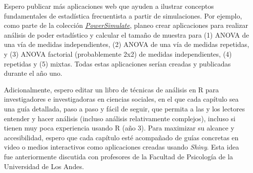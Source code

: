 \documentclass[11pt,a4paper,]{awesome-cv}
\begin{document}
\begin{footnotesize}

Espero publicar más aplicaciones web que ayuden a ilustrar conceptos fundamentales de estadística frecuentista a partir de simulaciones. Por ejemplo, como parte de la colección \href{https://shiny.jdl-svr.lat/PowerSimulate/}{\textit{PowerSimulate}}, planeo crear aplicaciones para realizar análisis de poder estadístico y calcular el tamaño de muestra para (1) ANOVA de una vía de medidas independientes, (2) ANOVA de una vía de medidas repetidas, y (3) ANOVA factorial (probablemente 2x2) de medidas independientes, (4) repetidas y (5) mixtas. Todas estas aplicaciones serían creadas y publicadas durante el año uno.

Adicionalmente, espero editar un libro de técnicas de análisis en R para investigadores e investigadoras en ciencias sociales, en el que cada capítulo sea una guía detallada, paso a paso y fácil de seguir, que permita a las y los lectores entender y hacer análisis (incluso análisis relativamente complejos), incluso si tienen muy poca experiencia usando R (año 3). Para maximizar su alcance y accesibilidad, espero que cada capítulo esté acompañado de guías concretas en video o medios interactivos como aplicaciones creadas usando \textit{Shiny}. Esta idea fue anteriormente discutida con profesores de la Facultad de Psicología de la Universidad de Los Andes. 

\end{footnotesize}
\end{document}
